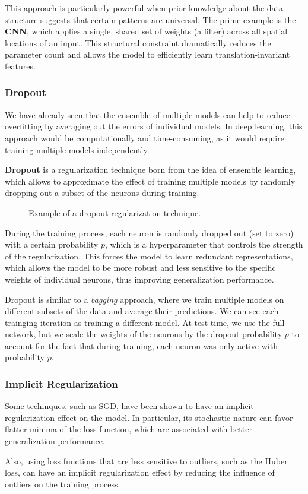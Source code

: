 This approach is particularly powerful when prior knowledge about the data structure suggests that certain patterns are universal. 
The prime example is the \textbf{CNN}, which applies a single, shared set of weights (a filter) across all spatial locations of an input. 
This structural constraint dramatically reduces the parameter count and allows the model to efficiently learn translation-invariant features.


\subsubsection{Dropout}
We have already seen that the ensemble of multiple models can help to reduce overfitting by averaging out the errors of individual models.
In deep learning, this approach would be computationally and time-consuming, as it would require training multiple models independently.

\textbf{Dropout} is a regularization technique born from the idea of ensemble learning, which allows to approximate the effect of training 
multiple models by randomly dropping out a subset of the neurons during training.
\begin{figure}[H]
    \centering
    
    \caption{Example of a dropout regularization technique.}
    \label{fig:dropout}
\end{figure}
During the training process, each neuron is randomly dropped out (set to zero) with a certain probability $p$, which is a hyperparameter that controls the strength of the regularization.
This forces the model to learn redundant representations, which allows the model to be more robust and less sensitive to the specific weights of individual neurons, 
thus improving generalization performance.

Dropout is similar to a \textit{bagging} approach, where we train multiple models on different subsets of the data and average their predictions.
We can see each trainging iteration as training a different model. At test time, we use the full network, but we scale the weights of the neurons by the dropout probability $p$ to account for the fact that during training, each neuron was only active with probability $p$.

\subsubsection{Implicit Regularization}
Some techinques, such as SGD, have been shown to have an implicit regularization effect on the model.
In particular, its stochastic nature can favor flatter minima of the loss function, which are associated with better generalization performance.

Also, using loss functions that are less sensitive to outliers, such as the Huber loss, can have an implicit regularization effect by reducing the influence of outliers on the training process.